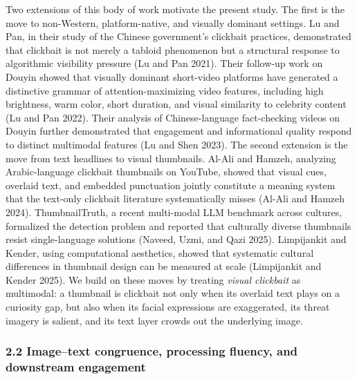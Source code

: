 \documentclass[
  12pt,
]{article}
\begin{document}
Two extensions of this body of work motivate the present study. The
first is the move to non-Western, platform-native, and visually dominant
settings. Lu and Pan, in their study of the Chinese government's
clickbait practices, demonstrated that clickbait is not merely a tabloid
phenomenon but a structural response to algorithmic visibility pressure
(Lu and Pan 2021). Their follow-up work on Douyin showed that visually
dominant short-video platforms have generated a distinctive grammar of
attention-maximizing video features, including high brightness, warm
color, short duration, and visual similarity to celebrity content (Lu
and Pan 2022). Their analysis of Chinese-language fact-checking videos
on Douyin further demonstrated that engagement and informational quality
respond to distinct multimodal features (Lu and Shen 2023). The second
extension is the move from text headlines to visual thumbnails. Al-Ali
and Hamzeh, analyzing Arabic-language clickbait thumbnails on YouTube,
showed that visual cues, overlaid text, and embedded punctuation jointly
constitute a meaning system that the text-only clickbait literature
systematically misses (Al-Ali and Hamzeh 2024). ThumbnailTruth, a recent
multi-modal LLM benchmark across cultures, formalized the detection
problem and reported that culturally diverse thumbnails resist
single-language solutions (Naveed, Uzmi, and Qazi 2025). Limpijankit and
Kender, using computational aesthetics, showed that systematic cultural
differences in thumbnail design can be measured at scale (Limpijankit
and Kender 2025). We build on these moves by treating \emph{visual
clickbait} as multimodal: a thumbnail is clickbait not only when its
overlaid text plays on a curiosity gap, but also when its facial
expressions are exaggerated, its threat imagery is salient, and its text
layer crowds out the underlying image.

\subsubsection{2.2 Image--text congruence, processing fluency, and
downstream
engagement}\label{imagetext-congruence-processing-fluency-and-downstream-engagement}
\end{document}
